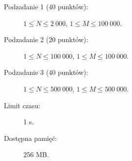 \documentclass{boi2014-pl}
\begin{document}
    \Scoring

    \begin{description}
        \item[Podzadanie 1 (40 punktów):] $1 \le N \le 2\ 000$, $1 \le M \le 100\ 000$.
        \item[Podzadanie 2 (20 punktów):] $1 \le N \le 100\ 000$, $1 \le M \le 100\ 000$.
        \item[Podzadanie 3 (40 punktów):] $1 \le N \le 500\ 000$, $1 \le M \le 500\ 000$.
    \end{description}

    \Constraints

    \begin{description}
        \item[Limit czasu:] 1 s.
        \item[Dostępna pamięć:] 256 MB.
    \end{description}
\end{document}
